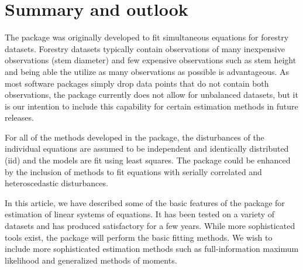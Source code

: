 

\section{Summary and outlook}\label{sec:Summmary}

The  package was originally developed to fit
simultaneous equations for forestry datasets. Forestry datasets
typically contain observations of many inexpensive observations
(stem diameter) and few expensive observations such
as stem height and being able the utilize as many observations as
possible is advantageous.
As most software packages simply drop data points that do not contain
both observations, the  package currently does not
allow for unbalanced datasets, but it is our intention to include this
capability for certain estimation methods in future releases.

For all of the methods developed in the package, the disturbances of
the individual equations are assumed to be independent and identically
distributed (iid) and the models are fit using least squares.  
The package could be enhanced by the inclusion of methods to fit
equations with serially correlated and heteroscedastic disturbances.

In this article, we have described some of the basic features of the
 package for estimation of linear systems of
equations. It has been tested on a variety of datasets and has
produced satisfactory for a few years. While more sophisticated tools
exist, the  package will perform the basic fitting
methods. We wish to include more sophisticated estimation methods such
as full-information maximum likelihood and generalized methods of
moments.





